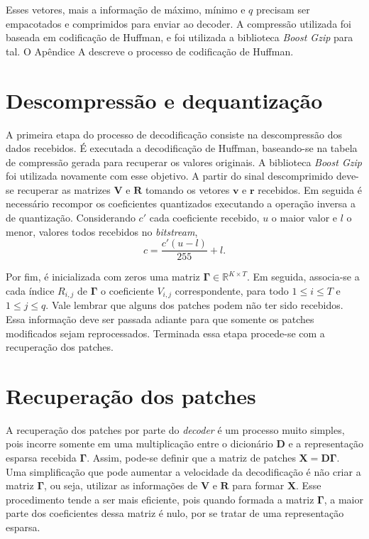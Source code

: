 \documentclass[cic,tc]{iiufrgs}
\renewcommand{\vec}[1]{\bm{#1}}
\newcommand{\mat}[1]{\bm{#1}}
\begin{document}
Esses vetores, mais a informação de máximo, mínimo e $q$ precisam ser empacotados 
e comprimidos para enviar ao decoder.
A compressão utilizada foi baseada em codificação de Huffman, e foi utilizada 
a biblioteca \textit{Boost Gzip} \cite{Boost} para tal. 
O Apêndice A descreve o processo de codificação de Huffman.


\section{Descompressão e dequantização}
\label{sec:decdeq}

A primeira etapa do processo de decodificação consiste na descompressão dos dados recebidos. 
É executada a decodificação de Huffman, 
baseando-se na tabela de compressão gerada para recuperar os valores originais.
A biblioteca \textit{Boost Gzip} \cite{Boost} foi utilizada novamente com esse objetivo.
A partir do sinal descomprimido deve-se recuperar as matrizes $\mat{V}$ e $\mat{R}$
tomando os vetores $\vec{v}$ e $\vec{r}$ recebidos.
Em seguida é necessário recompor os coeficientes quantizados 
executando a operação inversa a de quantização.
Considerando $c'$ cada coeficiente recebido, $u$ o maior valor e $l$ o menor, 
valores todos recebidos no \textit{bitstream},
\begin{equation*}
    c = \frac{c' (u - l)}{255} + l.
\end{equation*}

Por fim, é inicializada com zeros uma matriz $\mat{\Gamma} \in \mathbb{R}^{K \times T}$.
Em seguida, associa-se a cada índice $R_{i,j}$ de $\mat{\Gamma}$ o coeficiente
$V_{i,j}$ correspondente, para todo $1 \le i \le T$ e $1 \le j \le q$.
Vale lembrar que alguns dos patches podem não ter sido recebidos. 
Essa informação deve ser passada adiante para que somente os patches modificados
sejam reprocessados.
Terminada essa etapa procede-se com a recuperação dos patches.

\section{Recuperação dos patches}
A recuperação dos patches por parte do \textit{decoder} é um processo muito simples,
pois incorre somente em uma multiplicação entre o dicionário $\mat{D}$ e a 
representação esparsa recebida $\mat{\Gamma}$.
Assim, pode-se definir que a matriz de patches $\mat{X} = \mat{D} \mat{\Gamma}$.
Uma simplificação que pode aumentar a velocidade da decodificação é não criar a matriz $\mat{\Gamma}$,
ou seja, utilizar as informações de $\mat{V}$ e $\mat{R}$ para formar $\mat{X}$. 
Esse procedimento tende a ser mais eficiente, pois quando formada a matriz $\mat{\Gamma}$, 
a maior parte dos coeficientes dessa matriz é nulo, por se tratar de uma representação esparsa.
\end{document}
